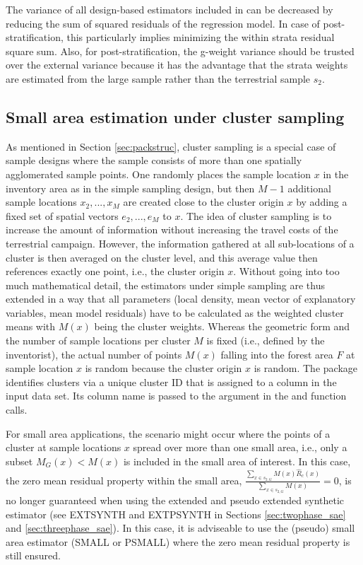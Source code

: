 \documentclass[article]{jss}
\begin{document}
The variance of all design-based estimators included in  can be decreased by reducing the sum of squared residuals of the regression model. In case of post-stratification, this particularly implies minimizing the within strata residual square sum. Also, for post-stratification, the g-weight variance should be trusted over the external variance because it has the advantage that the strata weights are estimated from the large sample rather than the terrestrial sample $s_2$.

\subsection{Small area estimation under cluster sampling}

As mentioned in Section \ref{sec:packstruc}, cluster sampling is a special case of sample designs where the sample consists of more than one spatially agglomerated sample points. One randomly places the sample location $x$ in the inventory area as in the simple sampling design, but then $M-1$ additional sample locations $x_2,...,x_M$ are created close to the cluster origin $x$ by adding a fixed set of spatial vectors $e_2,...,e_M$ to $x$. The idea of cluster sampling is to increase the amount of information without increasing the travel costs of the terrestrial campaign. However, the information gathered at all sub-locations of a cluster is then averaged on the cluster level, and this average value then references exactly one point, i.e., the cluster origin $x$. Without going into too much mathematical detail, the estimators under simple sampling are thus extended in a way that all parameters (local density, mean vector of explanatory variables, mean model residuals) have to be calculated as the weighted cluster means with $M(x)$ being the cluster weights. Whereas the geometric form and the number of sample locations per cluster $M$ is fixed (i.e., defined by the inventorist), the actual number of points $M(x)$ falling into the forest area $F$ at sample location $x$ is random because the cluster origin $x$ is random. The  package identifies clusters via a unique cluster ID that is assigned to a column in the input data set. Its column name is passed to the argument  in the  and  function calls.

For small area applications, the scenario might occur where the points of a cluster at sample locations $x$ spread over more than one small area, i.e., only a subset $M_{G}(x) < M(x)$ is included in the small area of interest. In this case, the zero mean residual property within the small area, $\frac{\sum_{x \in s_{2,G}}M(x)\hat{R}_{c}(x)}{\sum_{x \in s_{2,G}}M(x)}=0$, is no longer guaranteed when using the extended and pseudo extended synthetic estimator (see EXTSYNTH and EXTPSYNTH in Sections \ref{sec:twophase_sae} and \ref{sec:threephase_sae}). In this case, it is adviseable to use the (pseudo) small area estimator (SMALL or PSMALL) where the zero mean residual property is still ensured.
\end{document}
